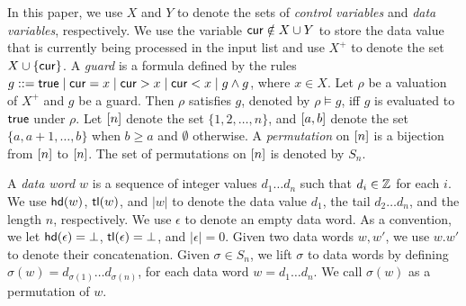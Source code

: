 In this paper, we use $X$ and $Y$ to denote the sets of \emph{control variables} and \emph{data variables}, respectively. We use the variable $\mathsf{cur} \notin X\cup Y$ to store the data value that is currently being processed in the input list and use $X^+$ to denote the set $X\cup \{\mathsf{cur}\}$.
A \emph{guard} is a formula defined by the rules $g::= \mathsf{true} \mid \mathsf{cur} = x \mid \mathsf{cur} > x \mid \mathsf{cur} < x \mid g \wedge g$, where $x \in X$.
%
%
Let $\rho$ be a valuation of $X^+$ and $g$ be a guard. Then $\rho$ satisfies $g$, denoted by $\rho \models g$, iff $g$ is evaluated to $\mathsf{true}$ under $\rho$. 
Let $[n]$ denote the set $\{ 1, 2, \dots, n \}$, and $[a,b]$ denote the set $\{ a, a+1, \dots, b \}$ when $b\geq a$ and $\emptyset$ otherwise. A \emph{permutation} on
$[n]$ is a bijection from $[n]$ to
$[n]$. The set of
permutations on $[n]$ is denoted by $S_n$.

A \emph{data word $w$} is a sequence of integer values $d_1\dots d_n$ such that $d_i \in {\mathbb{Z} }$ for each $i$.
We use $\mathsf{hd}(w)$, $\mathsf{tl}(w)$, and $|w|$ to denote the data value $d_1$, the tail $d_2\dots d_n$, and the length $n$, respectively.
We use $\epsilon$ to denote an empty data word. As a convention, we let $\mathsf{hd}(\epsilon)=\bot$, $\mathsf{tl}(\epsilon)=\bot$, and $|\epsilon|=0$.
Given two data words $w,w'$, we use $w.w'$ to denote their concatenation.
Given $\sigma \in S_n$, we lift $\sigma$ to data words by defining $\sigma(w)=d_{\sigma(1)} \dots d_{\sigma(n)}$, for each data word $w=d_1\dots d_n$. We call $\sigma(w)$ as a permutation of $w$.
